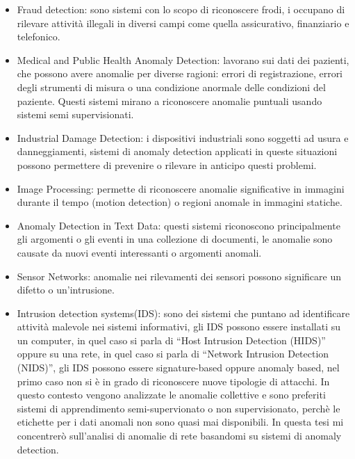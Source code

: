 \begin{itemize}

    \item Fraud detection: sono sistemi con lo scopo di riconoscere frodi, i occupano di rilevare attività illegali in diversi campi come quella assicurativo, finanziario e telefonico.
    \item Medical and Public Health Anomaly Detection: lavorano sui dati dei pazienti, che possono avere anomalie per diverse ragioni: errori di registrazione, errori degli strumenti di misura o una condizione anormale delle condizioni del paziente. Questi sistemi mirano a riconoscere anomalie puntuali usando sistemi semi supervisionati.
    \item Industrial Damage Detection: i dispositivi industriali sono soggetti ad usura e danneggiamenti, sistemi di anomaly detection applicati in queste situazioni possono permettere di prevenire o rilevare in anticipo questi problemi.
    \item Image Processing: permette di riconoscere anomalie significative in immagini durante il tempo (motion detection) o regioni anomale in immagini statiche.
    \item Anomaly Detection in Text Data: questi sistemi riconoscono principalmente gli argomenti o gli eventi in una collezione di documenti, le anomalie sono causate da nuovi eventi interessanti o argomenti anomali.
    \item Sensor Networks: anomalie nei rilevamenti dei sensori possono significare un difetto o un'intrusione.
    \item Intrusion detection systems(IDS): sono dei sistemi che puntano ad identificare attività malevole nei sistemi informativi, gli IDS possono essere installati su un computer, in quel caso si parla di ``Host Intrusion Detection (HIDS)'' oppure su una rete, in quel caso si parla di ``Network Intrusion Detection (NIDS)'', gli IDS possono essere signature-based oppure anomaly based, nel primo caso non si è in grado di riconoscere nuove tipologie di attacchi. In questo contesto vengono analizzate le anomalie collettive e sono preferiti sistemi di apprendimento semi-supervionato o non supervisionato, perchè le etichette per i dati anomali non sono quasi mai disponibili. In questa tesi mi concentrerò sull'analisi di anomalie di rete basandomi su sistemi di anomaly detection. 
\end{itemize}

